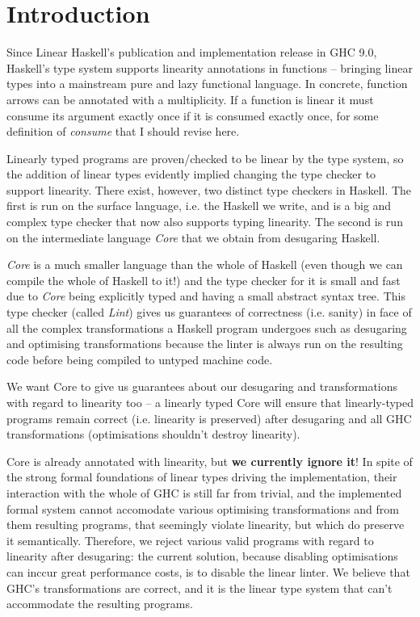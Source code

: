 \documentclass[a4paper, draft]{article}
\begin{document}
\section{Introduction}


Since Linear Haskell's\cite{} publication and implementation release in GHC 9.0,
Haskell's type system supports linearity annotations in functions -- bringing
linear types into a mainstream pure and lazy functional language. In concrete,
function arrows can be annotated with a multiplicity. If a function is linear it
must consume its argument exactly once if it is consumed exactly once, for some
definition of \emph{consume} that I should revise here.

Linearly typed programs are proven/checked to be linear by the type system, so
the addition of linear types evidently implied changing the type checker to
support linearity. There exist, however, two distinct type checkers in Haskell.
The first is run on the surface language, i.e. the Haskell we write, and is a
big and complex type checker that now also supports typing linearity. The second
is run on the intermediate language \emph{Core} that we obtain from desugaring
Haskell.

\emph{Core} is a much smaller language than the whole of Haskell (even though we
can compile the whole of Haskell to it!) and the type checker for it is small
and fast due to \emph{Core} being explicitly typed and having a small abstract syntax
tree. This type checker (called \emph{Lint}) gives us guarantees of correctness
(i.e. sanity) in face of all the complex transformations a Haskell program
undergoes such as desugaring and optimising transformations because the linter
is always run on the resulting code before being compiled to untyped machine
code.


We want Core to give us guarantees about our desugaring and transformations with
regard to linearity too -- a linearly typed Core will ensure that linearly-typed
programs remain correct (i.e.  linearity is preserved) after desugaring and all
GHC transformations (optimisations shouldn't destroy linearity).

Core is already annotated with linearity, but \textbf{we currently ignore it}!
In spite of the strong formal foundations of linear types driving the
implementation, their interaction with the whole of GHC is still far from
trivial, and the implemented formal system cannot accomodate various
optimising transformations and from them resulting programs, that seemingly
violate linearity, but which do preserve it semantically. Therefore, we reject
various valid programs with regard to linearity after desugaring: the current
solution, because disabling optimisations can inccur great performance costs, is
to disable the linear linter. We believe that GHC's transformations are correct,
and it is the linear type system that can't accommodate the resulting programs.
\end{document}
